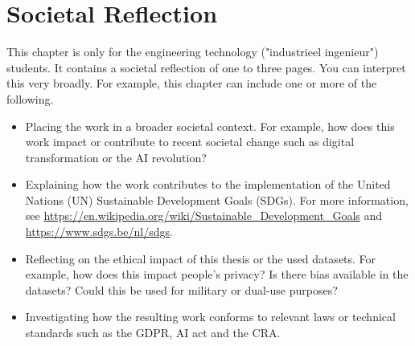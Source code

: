 \chapter*{Societal Reflection}
\label{chap:ethics}


This chapter is only for the engineering technology ("industrieel ingenieur") students. It contains a societal reflection of one to three pages. You can interpret this very broadly. For example, this chapter can include one or more of the following.

\begin{itemize}
    \item Placing the work in a broader societal context. For example, how does this work impact or contribute to recent societal change such as digital transformation or the AI revolution?
    \item Explaining how the work contributes to the implementation of the United Nations (UN) Sustainable Development Goals (SDGs). For more information, see \url{https://en.wikipedia.org/wiki/Sustainable_Development_Goals} and \url{https://www.sdgs.be/nl/sdgs}.
    \item Reflecting on the ethical impact of this thesis or the used datasets. For example, how does this impact people's privacy? Is there bias available in the datasets? Could this be used for military or dual-use purposes?
    \item Investigating how the resulting work conforms to relevant laws or technical standards such as the GDPR, AI act and the CRA.
\end{itemize}
